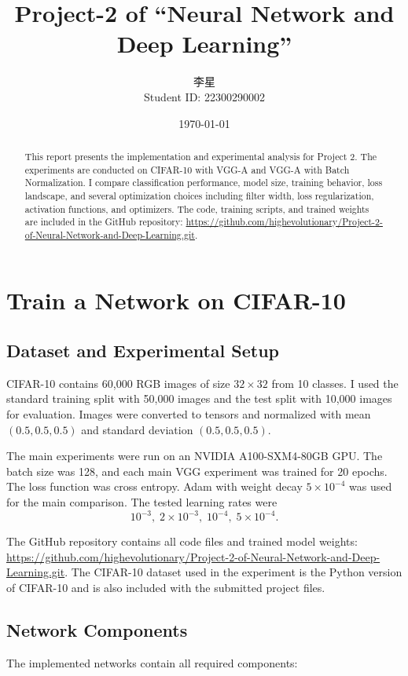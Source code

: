 \documentclass[11pt,a4paper]{article}
\title{Project-2 of ``Neural Network and Deep Learning''}
\author{李星 \\ Student ID: 22300290002}
\date{\today}
\newcommand{\githuburl}{\url{https://github.com/highevolutionary/Project-2-of-Neural-Network-and-Deep-Learning.git}}
\begin{document}
\maketitle

\begin{abstract}
This report presents the implementation and experimental analysis for Project 2.
The experiments are conducted on CIFAR-10 with VGG-A and VGG-A with Batch
Normalization. I compare classification performance, model size, training
behavior, loss landscape, and several optimization choices including filter
width, loss regularization, activation functions, and optimizers. The code,
training scripts, and trained weights are included in the GitHub repository:
\githuburl.
\end{abstract}

\section{Train a Network on CIFAR-10}

\subsection{Dataset and Experimental Setup}

CIFAR-10 contains 60,000 RGB images of size $32\times32$ from 10 classes. I used
the standard training split with 50,000 images and the test split with 10,000
images for evaluation. Images were converted to tensors and normalized with mean
$(0.5,0.5,0.5)$ and standard deviation $(0.5,0.5,0.5)$.

The main experiments were run on an NVIDIA A100-SXM4-80GB GPU. The batch size
was 128, and each main VGG experiment was trained for 20 epochs. The loss
function was cross entropy. Adam with weight decay $5\times10^{-4}$ was used for
the main comparison. The tested learning rates were
\[
    10^{-3},\; 2\times 10^{-3},\; 10^{-4},\; 5\times 10^{-4}.
\]

The GitHub repository contains all code files and trained model weights:
\githuburl. The CIFAR-10 dataset used in the experiment is the Python version of
CIFAR-10 and is also included with the submitted project files.

\subsection{Network Components}

The implemented networks contain all required components:
\end{document}

